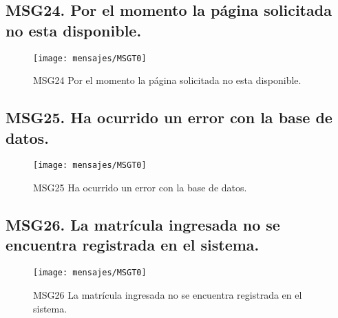 \subsection{MSG24. Por el momento la página solicitada no esta disponible.}
    \begin{figure}[htbp]
        \begin{center}
            \texttt{[image: mensajes/MSGT0]}
            \caption{MSG24 Por el momento la página solicitada no esta disponible.}
            \label{fig:MSG24}
        \end{center}
    \end{figure}

\subsection{MSG25. Ha ocurrido un error con la base de datos.}
    \begin{figure}[htbp]
        \begin{center}
            \texttt{[image: mensajes/MSGT0]}
            \caption{MSG25 Ha ocurrido un error con la base de datos.}
            \label{fig:MSG25}
        \end{center}
    \end{figure}

\subsection{MSG26. La matrícula ingresada no se encuentra registrada en el sistema.}
    \begin{figure}[htbp]
        \begin{center}
            \texttt{[image: mensajes/MSGT0]}
            \caption{MSG26 La matrícula ingresada no se encuentra registrada en el sistema.}
            \label{fig:MSG26}
        \end{center}
    \end{figure}

